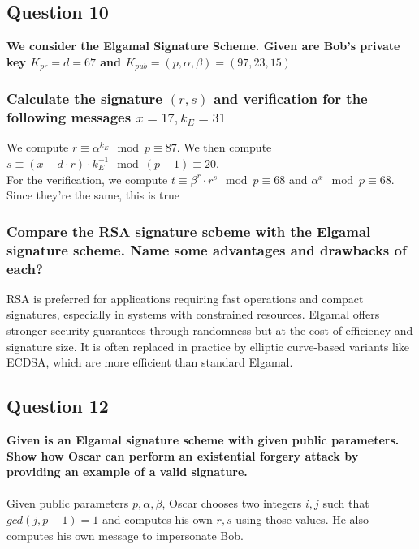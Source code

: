\documentclass[titlepage]{article}
\begin{document}
{\subsection{Question 10}
{
\textbf{We consider the Elgamal Signature Scheme. Given are Bob's private key \(K_{pr} = d = 67\) and \(K_{pub} = (p, \alpha, \beta) = (97, 23, 15)\)}
\subsubsection{Calculate the signature \((r, s)\) and verification for the following messages \(x = 17, k_E = 31\)}
{
We compute \(r \equiv \alpha^{k_E} \mod p \equiv 87\). We then compute \(s \equiv (x - d \cdot r) \cdot k_E^{-1} \mod (p - 1) \equiv 20\).\\For the verification, we compute \(t \equiv \beta^r \cdot r^s \mod p \equiv 68\) and \(\alpha^x \mod p \equiv 68\). Since they're the same, this is true
}
\subsubsection{Compare the RSA signature scbeme with the Elgamal signature scheme. Name some advantages and drawbacks of each?}
{
RSA is preferred for applications requiring fast operations and compact signatures, especially in systems with constrained resources. Elgamal offers stronger security guarantees through randomness but at the cost of efficiency and signature size. It is often replaced in practice by elliptic curve-based variants like ECDSA, which are more efficient than standard Elgamal.
}
}
\subsection{Question 12}
{
\textbf{Given is an Elgamal signature scheme with given public parameters. Show how Oscar can perform an existential forgery attack by providing an example of a valid signature.}\\\\
Given public parameters \(p, \alpha, \beta\), Oscar chooses two integers \(i, j\) such that \(gcd(j,p-1) = 1\) and computes his own \(r, s\) using those values. He also computes his own message to impersonate Bob. 
}
}
\end{document}
